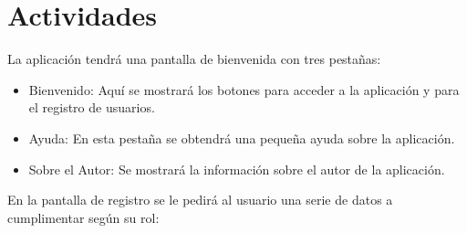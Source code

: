	\section{Actividades}
		La aplicación tendrá una pantalla de bienvenida con tres pestañas:
		\begin{itemize}
			\item Bienvenido: Aquí se mostrará los botones para acceder a la aplicación y para el registro de usuarios.
			\item Ayuda: En esta pestaña se obtendrá una pequeña ayuda sobre la aplicación.
			\item Sobre el Autor: Se mostrará la información sobre el autor de la aplicación.
		\end{itemize}
		
		En la pantalla de registro se le pedirá al usuario una serie de datos a cumplimentar según su rol: 
